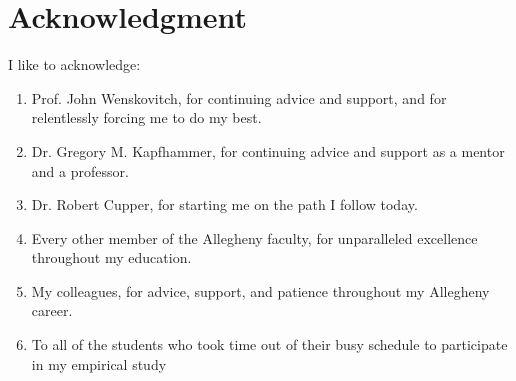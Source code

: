 \chapter*{Acknowledgment}\label{ch:ack}

I like to acknowledge:

\begin{enumerate}


\item[]
Prof. John Wenskovitch, for continuing advice and support, and for relentlessly forcing me to do my best.

\item[]
Dr. Gregory M. Kapfhammer, for continuing advice and support as a mentor and a professor.

\item[]
Dr. Robert Cupper, for starting me on the path I follow today.

\item[]
Every other member of the Allegheny faculty, for unparalleled excellence throughout my education.

\item[]
My colleagues, for advice, support, and patience throughout my Allegheny career.

\item[]
To all of the students who took time out of their busy schedule to participate in my empirical study

\end{enumerate}